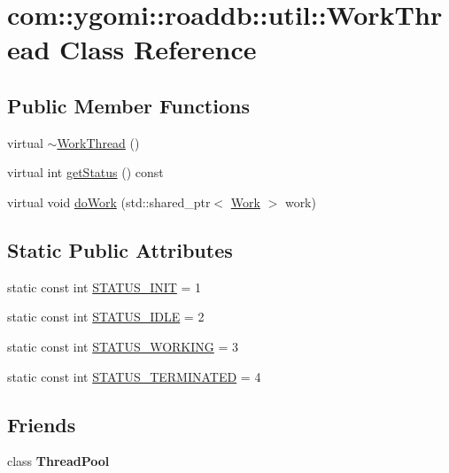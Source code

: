 \hypertarget{classcom_1_1ygomi_1_1roaddb_1_1util_1_1WorkThread}{\section{com\-:\-:ygomi\-:\-:roaddb\-:\-:util\-:\-:Work\-Thread Class Reference}
\label{classcom_1_1ygomi_1_1roaddb_1_1util_1_1WorkThread}
}
\subsection*{Public Member Functions}
\begin{DoxyCompactItemize}
\item 
virtual \hyperlink{classcom_1_1ygomi_1_1roaddb_1_1util_1_1WorkThread_a0ec3db7dda670d07dd3ed080f2d7e40c}{$\sim$\-Work\-Thread} ()
\item 
virtual int \hyperlink{classcom_1_1ygomi_1_1roaddb_1_1util_1_1WorkThread_a4ecf08df35765b316742bf32f24b6cf0}{get\-Status} () const 
\item 
virtual void \hyperlink{classcom_1_1ygomi_1_1roaddb_1_1util_1_1WorkThread_afadf70a2f873ad2a5119c98467e8cc19}{do\-Work} (std\-::shared\-\_\-ptr$<$ \hyperlink{classcom_1_1ygomi_1_1roaddb_1_1util_1_1Work}{Work} $>$ work)
\end{DoxyCompactItemize}
\subsection*{Static Public Attributes}
\begin{DoxyCompactItemize}
\item 
static const int \hyperlink{classcom_1_1ygomi_1_1roaddb_1_1util_1_1WorkThread_a327f2a2fcfd8a63f1684e6a7f4139558}{S\-T\-A\-T\-U\-S\-\_\-\-I\-N\-I\-T} = 1
\item 
static const int \hyperlink{classcom_1_1ygomi_1_1roaddb_1_1util_1_1WorkThread_ad6bc7481694d9df02ebcd1b827abb755}{S\-T\-A\-T\-U\-S\-\_\-\-I\-D\-L\-E} = 2
\item 
static const int \hyperlink{classcom_1_1ygomi_1_1roaddb_1_1util_1_1WorkThread_a7db27d123b3e2f4c5512bad8cbb67aee}{S\-T\-A\-T\-U\-S\-\_\-\-W\-O\-R\-K\-I\-N\-G} = 3
\item 
static const int \hyperlink{classcom_1_1ygomi_1_1roaddb_1_1util_1_1WorkThread_a936330c526d2a547c63831d9596acb53}{S\-T\-A\-T\-U\-S\-\_\-\-T\-E\-R\-M\-I\-N\-A\-T\-E\-D} = 4
\end{DoxyCompactItemize}
\subsection*{Friends}
\begin{DoxyCompactItemize}
\item 
\hypertarget{classcom_1_1ygomi_1_1roaddb_1_1util_1_1WorkThread_a5d97748be7d69dcc44ef551ea35ef20f}{class {\bfseries Thread\-Pool}}\label{classcom_1_1ygomi_1_1roaddb_1_1util_1_1WorkThread_a5d97748be7d69dcc44ef551ea35ef20f}

\end{DoxyCompactItemize}


